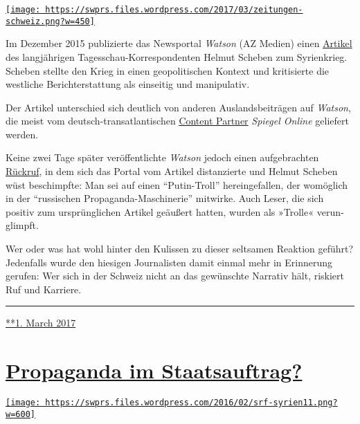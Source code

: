 \href{https://swprs.org/2017/03/01/das-gewuenschte-narrativ-ii/}{\texttt{[image: https://swprs.files.wordpress.com/2017/03/zeitungen-schweiz.png?w=450]}}

Im Dezember 2015 publi­zierte das News­portal \emph{Watson} (AZ Medien)
einen \href{https://www.watson.ch/!148360008}{Artikel} des lang­jährigen
Tages­schau-Kor­res­pon­denten Hel­mut Sche­­ben zum Syrien­krieg.
Scheben stellte den Krieg in einen geo­po­li­tischen Kontext und
kri­ti­sierte die westliche Be­richt­er­stattung als einseitig und
ma­ni­pu­la­tiv.

Der Artikel un­ter­schied sich deutlich von anderen Aus­lands­bei­trägen
auf \emph{Watson}, die meist vom deutsch-transatlantischen
\href{https://www.watson.ch/Corporate/articles/502582965-Spiegel-Online-und-watson-machen-gemeinsame-Sache}{Content
Partner} \emph{Spiegel Online} geliefert werden.

Keine zwei Tage später veröffentlichte \emph{Watson} jedoch einen
aufgebrachten \href{https://www.watson.ch/!491379853}{Rückruf}, in dem
sich das Portal vom Artikel distanzierte und Helmut Scheben wüst
beschimpfte: Man sei auf einen ``Putin-Troll'' herein­ge­fallen, der
wo­möglich in der ``russischen Propaganda-Maschinerie'' mit­wirke. Auch
Leser, die sich positiv zum ur­sprüng­lichen Artikel geäußert hatten,
wurden als »Trolle« verun­glimpft.

Wer oder was hat wohl hinter den Kulissen zu dieser selt­samen Reak­tion
geführt? Jeden­falls wurde den hiesigen Journa­listen damit einmal mehr
in Er­in­nerung gerufen: Wer sich in der Schweiz nicht an das
ge­wünschte Nar­ra­tiv hält, ris­kiert Ruf und Karriere.

\begin{center}\rule{0.5\linewidth}{\linethickness}\end{center}

\href{https://swprs.org/2017/03/01/das-gewuenschte-narrativ-ii/}{**1.
March 2017}

\hypertarget{propaganda-im-staatsauftrag}{%
\section{\texorpdfstring{\href{https://swprs.org/2017/03/01/propaganda-im-staatsauftrag/}{Propaganda
im
Staatsauftrag?}}{Propaganda im Staatsauftrag?}}\label{propaganda-im-staatsauftrag}}

\href{https://swprs.org/2017/03/01/propaganda-im-staatsauftrag/}{\texttt{[image: https://swprs.files.wordpress.com/2016/02/srf-syrien11.png?w=600]}}

